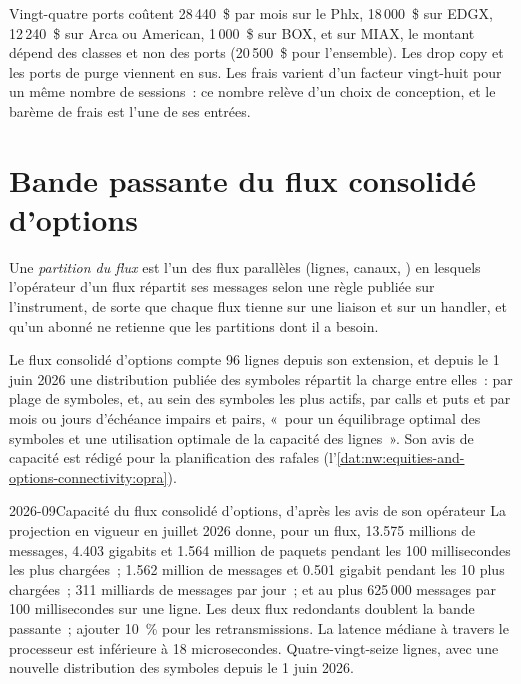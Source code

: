 Vingt-quatre ports coûtent 28\,440~\$ par mois sur le Phlx, 18\,000~\$ sur EDGX, 12\,240~\$ sur Arca ou American, 1\,000~\$ sur BOX, et
sur MIAX, le montant dépend des classes et non des ports (20\,500~\$ pour l'ensemble). Les drop copy et les ports de purge viennent en
sus. Les frais varient d'un facteur vingt-huit pour un même nombre de sessions~: ce nombre relève d'un choix de conception, et le barème
de frais est l'une de ses entrées.

\section{Bande passante du flux consolidé d'options}

\begin{definition}\label{def:nw:equities-and-options-connectivity:partition}
Une \emph{partition du flux} est l'un des flux parallèles (lignes, canaux, ) en lesquels
l'opérateur d'un flux répartit ses messages selon une règle publiée sur l'instrument, de sorte que chaque flux tienne sur une liaison et sur un handler, et qu'un abonné
ne retienne que les partitions dont il a besoin.
\end{definition}

Le flux consolidé d'options compte 96 lignes depuis son extension, et depuis le 1 juin 2026 une distribution publiée des symboles
répartit la charge entre elles~: par plage de symboles, et, au sein des symboles les plus actifs, par calls et puts et par mois ou jours d'échéance
impairs et pairs, «~pour un équilibrage optimal des symboles et une utilisation optimale de la capacité des lignes~». Son avis de capacité est rédigé pour
la planification des rafales (l'\cref{dat:nw:equities-and-options-connectivity:opra}).

\begin{dated}{2026-09}{Capacité du flux consolidé d'options, d'après les avis de son opérateur}\label{dat:nw:equities-and-options-connectivity:opra}
La projection en vigueur en juillet 2026 donne, pour un flux, 13.575 millions de messages, 4.403 gigabits et 1.564 million de paquets
pendant les 100 millisecondes les plus chargées~; 1.562 million de messages et 0.501 gigabit pendant les 10 plus chargées~; 311 milliards de messages par jour~;
et au plus 625\,000 messages par 100 millisecondes sur une ligne. Les deux flux redondants doublent la bande passante~; ajouter 10~\% pour
les retransmissions. La latence médiane à travers le processeur est inférieure à 18 microsecondes. Quatre-vingt-seize lignes, avec une nouvelle
distribution des symboles depuis le 1 juin 2026.
\end{dated}

